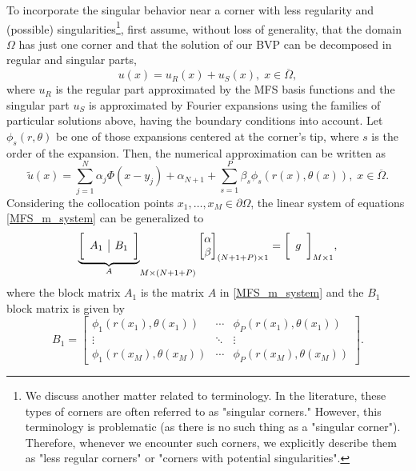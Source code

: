 To incorporate the singular behavior near a corner with less regularity and (possible) singularities\footnote{We discuss another matter related to terminology. In the literature, these types of corners are often referred to as "singular corners." However, this terminology is problematic (as there is no such thing as a "singular corner"). Therefore, whenever we encounter such corners, we explicitly describe them as "less regular corners" or "corners with potential singularities".}, first assume, without loss of generality, that the domain \(\Omega\) has just one corner and that the solution of our \ac{BVP} can be decomposed in regular and singular parts,
\[
    u(x) = u_R(x) + u_S(x), \; x \in \overline{\Omega},
\]
where \(u_R\) is the regular part approximated by the \ac{MFS} basis functions and the singular part \(u_S\) is approximated by Fourier expansions using the families of particular solutions above, having the boundary conditions into account. Let \(\phi_s(r, \theta)\) be one of those expansions centered at the corner's tip, where \(s\) is the order of the expansion. Then, the numerical approximation can be written as
\begin{equation}
    \tilde{u}(x) = \sum_{j=1}^{N}\alpha_j \Phi(x-y_j) + \alpha_{N+1} + \sum_{s=1}^{P} \beta_s \phi_s(r(x),\theta(x)), \; x \in \overline{\Omega}.
\end{equation}
Considering the collocation points \(x_1,\dots,x_M \in \partial \Omega\), the linear system of equations \eqref{MFS_m_system} can be generalized to
\begin{equation}
    {\underbrace{\bigg[ \begin{array}{c | c}
        A_1 & B_1 \\
    \end{array} \bigg]}_{A}}_{M\times(N+1+P)}
    \begin{bmatrix}
        \alpha\\
        \beta
    \end{bmatrix}_{(N+1+P)\times 1}
    =
    \bigg[ \begin{array}{c}
        g \\
    \end{array} \bigg]_{M\times 1},
\end{equation}
where the block matrix \(A_1\) is the matrix \(A\) in \eqref{MFS_m_system} and the \(B_1\) block matrix is given by
\[
    B_1=\begin{bmatrix}
        \phi_1(r(x_1), \theta(x_1)) & \cdots & \phi_P(r(x_1), \theta(x_1)) \\
        \vdots & \ddots & \vdots\\
        \phi_1(r(x_M), \theta(x_M)) & \cdots & \phi_P(r(x_M), \theta(x_M))
    \end{bmatrix}.
\]


